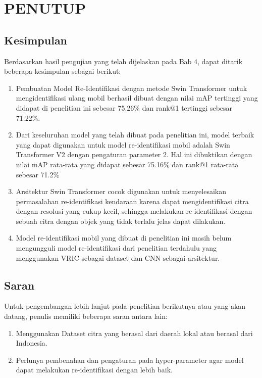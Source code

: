 \chapter{PENUTUP}
\label{chap:penutup}


\section{Kesimpulan}
\label{sec:kesimpulan}

Berdasarkan hasil pengujian yang telah dijelaskan pada Bab 4, dapat 
ditarik beberapa kesimpulan sebagai berikut:

\begin{enumerate}[nolistsep]

  \item Pembuatan Model Re-Identifikasi dengan metode Swin Transformer untuk 
  mengidentifikasi ulang mobil berhasil dibuat dengan nilai mAP tertinggi yang didapat 
  di penelitian ini sebesar 75.26\% dan rank@1 tertinggi sebesar 71.22\%.

  \item Dari keseluruhan model yang telah dibuat pada penelitian ini, 
  model terbaik yang dapat digunakan untuk model re-identifikasi mobil adalah 
  Swin Transformer V2 dengan pengaturan parameter 2. Hal ini dibuktikan dengan nilai 
  mAP rata-rata yang didapat sebesar 75.16\% dan rank@1 rata-rata sebesar 71.2\%

  \item Arsitektur Swin Transformer cocok digunakan untuk menyelesaikan permasalahan 
  re-identifikasi kendaraan karena dapat mengidentifikasi citra dengan resolusi yang cukup 
  kecil, sehingga melakukan re-identifikasi dengan sebuah citra dengan objek yang 
  tidak terlalu jelas dapat dilakukan.

  \item Model re-identifikasi mobil yang dibuat di penelitian ini masih belum mengungguli 
  model re-identifikasi dari penelitian terdahulu yang menggunakan VRIC sebagai dataset 
  dan CNN sebagai arsitektur.

\end{enumerate}

\section{Saran}
\label{chap:saran}

Untuk pengembangan lebih lanjut pada penelitian berikutnya atau yang akan datang, \linebreak
penulis memiliki beberapa saran antara lain:

\begin{enumerate}[nolistsep]

  \item Menggunakan Dataset citra yang berasal dari daerah lokal atau berasal dari Indonesia.

  \item Perlunya pembenahan dan pengaturan pada hyper-parameter agar model dapat melakukan 
  re-identifikasi dengan lebih baik.

\end{enumerate}
